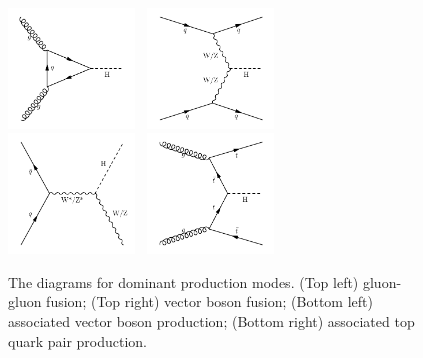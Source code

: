 \begin{figure}[!ht]
  \begin{center}  
    \includegraphics[width=0.3\textwidth]{Fig/Higgs_ggF}~
    \includegraphics[width=0.3\textwidth]{Fig/Higgs_VBF}\\
    \includegraphics[width=0.3\textwidth]{Fig/Higgs_ZWH}~
    \includegraphics[width=0.3\textwidth]{Fig/Higgs_ttH}\\
    \caption{The diagrams for dominant production modes. (Top left) gluon-gluon fusion; (Top right) vector boson fusion; (Bottom left) associated vector boson production; (Bottom right) associated top quark pair production. \label{fig:higgsdiags}}  
  \end{center}
\end{figure} 

